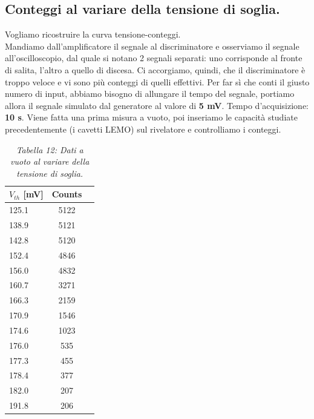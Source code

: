 \documentclass[a4paper]{article}
\begin{document}
\subsection{Conteggi al variare della tensione di soglia.}
Vogliamo ricostruire la curva tensione-conteggi.\\
Mandiamo dall'amplificatore il segnale al discriminatore e osserviamo il segnale all'oscilloscopio, dal quale si notano 2 segnali separati: uno corrisponde al fronte di salita, l'altro a quello di discesa. Ci accorgiamo, quindi, che il discriminatore è troppo veloce e vi sono più conteggi di quelli effettivi. Per far sì che conti il giusto numero di input, abbiamo bisogno di allungare il tempo del segnale, portiamo allora il segnale simulato dal generatore al valore di \textbf{5 mV}. Tempo d'acquisizione: \textbf{10 s}.
Viene fatta una prima misura a vuoto, poi inseriamo le capacità studiate precedentemente (i cavetti LEMO) sul rivelatore e controlliamo i conteggi.

\begin{table}[H]
	
		\begin{tabular}{lcc}
			\hline
			\hline
			\textbf{$V_{th}$} [mV] & \textbf{Counts}  	\\
			\hline
			\hline
				      125.1 &  5122   	\\
				      138.9 &  5121     \\
				      142.8 &  5120	  \\
				      152.4 &  4846	 \\
				      156.0 &  4832	 \\
				      160.7 &  3271	 \\
				      166.3 &  2159	  \\
				      170.9 &  1546	 \\
				      174.6 &  1023	 \\
				      176.0 &  535	  \\
				      177.3 &  455  \\
				      178.4 &  377  \\
				      182.0 &  207  \\
				      191.8 &  206  \\
			\hline
			\hline
		\end{tabular}
		\linebreak
		\caption{\textit{Tabella 12: Dati a vuoto al variare della tensione di soglia.}}\label{tab:12} 
	\end{table}	
\end{document}
